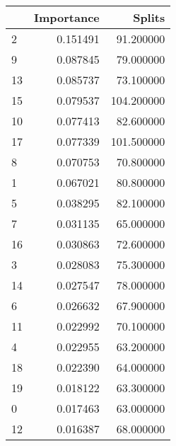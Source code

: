 \begin{tabular}{lrr}
\toprule
 & Importance & Splits \\
\midrule
2 & 0.151491 & 91.200000 \\
9 & 0.087845 & 79.000000 \\
13 & 0.085737 & 73.100000 \\
15 & 0.079537 & 104.200000 \\
10 & 0.077413 & 82.600000 \\
17 & 0.077339 & 101.500000 \\
8 & 0.070753 & 70.800000 \\
1 & 0.067021 & 80.800000 \\
5 & 0.038295 & 82.100000 \\
7 & 0.031135 & 65.000000 \\
16 & 0.030863 & 72.600000 \\
3 & 0.028083 & 75.300000 \\
14 & 0.027547 & 78.000000 \\
6 & 0.026632 & 67.900000 \\
11 & 0.022992 & 70.100000 \\
4 & 0.022955 & 63.200000 \\
18 & 0.022390 & 64.000000 \\
19 & 0.018122 & 63.300000 \\
0 & 0.017463 & 63.000000 \\
12 & 0.016387 & 68.000000 \\
\bottomrule
\end{tabular}
